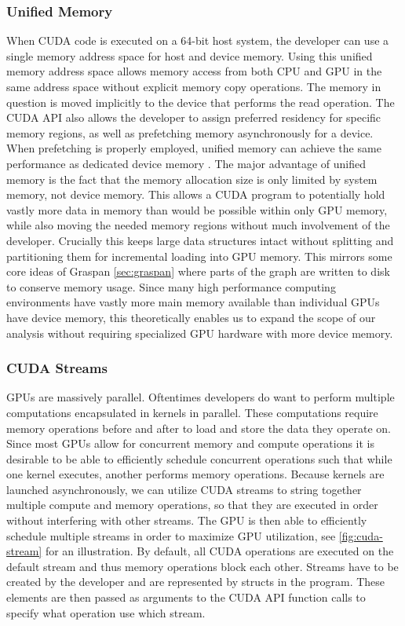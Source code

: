 \subsubsection{Unified Memory}
When CUDA code is executed on a 64-bit host system, the developer can use a single memory address space for host and device memory.
Using this unified memory address space allows memory access from both CPU and GPU in the same address space without explicit memory copy operations.
The memory in question is moved implicitly to the device that performs the read operation. The CUDA API also allows the developer to assign preferred residency for specific memory regions, as well as prefetching memory asynchronously for a device. When prefetching is properly employed, unified memory can achieve the same performance as dedicated device memory \cite{cudaunifiedmem}.
The major advantage of unified memory is the fact that the memory allocation size is only limited by system memory, not device memory.
This allows a CUDA program to potentially hold vastly more data in memory than would be possible within only GPU memory, while also moving the needed memory regions without much involvement of the developer.
Crucially this keeps large data structures intact without splitting and partitioning them for incremental loading into GPU memory.
This mirrors some core ideas of Graspan \autoref{sec:graspan} where parts of the graph are written to disk to conserve memory usage.
Since many high performance computing environments have vastly more main memory available than individual GPUs have device memory, this theoretically enables us to expand the scope of our analysis without requiring specialized GPU hardware with more device memory.

\subsubsection{CUDA Streams}
GPUs are massively parallel. Oftentimes developers do want to perform multiple computations encapsulated in kernels in parallel.
These computations require memory operations before and after to load and store the data they operate on.
Since most GPUs allow for concurrent memory and compute operations it is desirable to be able to efficiently schedule concurrent operations such that while one kernel executes, another performs memory operations.
Because kernels are launched asynchronously, we can utilize CUDA streams to string together multiple compute and memory operations, so that they are executed in order without interfering with other streams.
The GPU is then able to efficiently schedule multiple streams in order to maximize GPU utilization, see  \autoref{fig:cuda-stream} for an illustration.
By default, all CUDA operations are executed on the default stream and thus memory operations block each other.
Streams have to be created by the developer and are represented by structs in the program. These elements are then passed as arguments to the CUDA API function calls to specify what operation use which stream.

